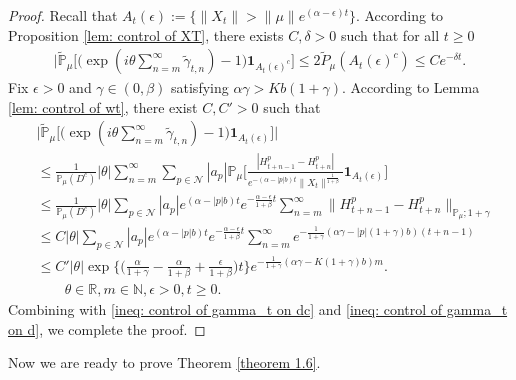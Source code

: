 \documentclass[12pt,a4paper]{amsart}
\theoremstyle{plain}
\theoremstyle{definition}
\numberwithin{equation}{section}
\begin{document}
\begin{proof}
Recall that $A_t(\epsilon):=\{\|X_t\|>\|\mu\|e^{(\alpha-\epsilon) t}\}$. According to Proposition \ref{lem: control of XT}, there exists
	$C,\delta>0$ such that for all $t\geq 0$
\begin{align}\label{ineq: control of gamma_t on dc}
     \Big|\tilde{\mathbb{P}}_{\mu}\Big[\big(\exp(i\theta \sum_{n=m}^{\infty}\tilde{\gamma}_{t,n})-1\big)\mathbf{1}_{A_t(\epsilon)^c}\Big]\leq 2\tilde{P}_{\mu}(A_t(\epsilon)^c)\leq C e^{-\delta t}.
\end{align}
	 Fix $\epsilon>0$ and $\gamma\in(0,\beta)$ satisfying $\alpha\gamma>Kb(1+\gamma)$.  According to Lemma \ref{lem: control of wt}, there exist $C,C'>0$ such that
\begin{align}\label{ineq: control of gamma_t on d}
  &\Big|\tilde{\mathbb{P}}_{\mu}\Big[\big(\exp(i\theta \sum_{n=m}^{\infty}\tilde{\gamma}_{t,n})-1\big)\mathbf{1}_{A_t(\epsilon)}\Big]\Big|\\
  &\leq \frac{1}{\mathbb{P}_{\mu}(D^c)}|\theta|\sum_{n=m}^{\infty}\sum_{p\in \mathcal{N}}|a_p|\mathbb{P}_{\mu}\Big[\frac{|H_{t+n-1}^p-H_{t+n}^p|}{e^{-(\alpha-|p|b)t}\|X_t\|^{\frac{1}{1+\beta}}}\mathbf{1}_{A_t(\epsilon)}\Big]\\
  &\leq  \frac{1}{\mathbb{P}_{\mu}(D^c)}|\theta|\sum_{p\in \mathcal{N}}|a_p|e^{(\alpha-|p|b)t}e^{-\frac{\alpha-\epsilon}{1+\beta}t}\sum_{n=m}^{\infty}\|H_{t+n-1}^p-H_{t+n}^p\|_{\mathbb{P}_{\mu};1+\gamma}\\
  &\leq C|\theta|\sum_{p\in \mathcal{N}}|a_p|e^{(\alpha-|p|b)t}e^{-\frac{\alpha-\epsilon}{1+\beta}t}\sum_{n=m}^{\infty}e^{-\frac{1}{1+\gamma}(\alpha\gamma-|p|(1+\gamma)b)(t+n-1)}\\
  &\leq C'|\theta|\exp\Big\{\Big(\frac{\alpha}{1+\gamma}-\frac{\alpha}{1+\beta}+\frac{\epsilon}{1+\beta}\Big)t\Big\}e^{-\frac{1}{1+\gamma}(\alpha\gamma-K(1+\gamma)b)m}.\\
  & \qquad\theta\in\mathbb{R}, m\in \mathbb{N}, \epsilon>0, t\geq 0.
\end{align}
Combining with \eqref{ineq: control of gamma_t on dc} and \eqref{ineq: control of gamma_t on d}, we complete the proof.
\end{proof}
Now we are ready to prove Theorem \ref{theorem 1.6}.
\bigskip
\end{document}
